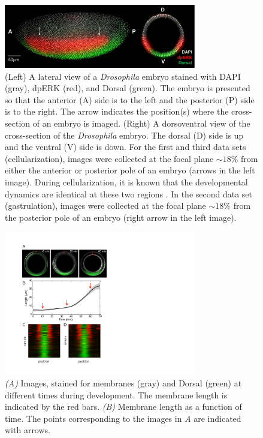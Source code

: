 \documentclass{pnastwo}
\begin{document}
\begin{figure}
\includegraphics[width=8.4cm]{ap_dv}
\caption{(Left) A lateral view of a {\it Drosophila} embryo stained with DAPI (gray), dpERK (red), and Dorsal (green). The embryo is presented so that the anterior (A) side is to the left and the posterior (P) side is to the right. The arrow indicates the position(s) where the cross-section of an embryo is imaged. (Right) A dorsoventral view of the cross-section of the {\it Drosophila} embryo. The dorsal (D) side is up and the ventral (V) side is down. For the first and third data sets (cellularization), images were collected at the focal plane $\sim 18\%$ from either the anterior or posterior pole of an embryo (arrows in the left image). During cellularization, it is known that the developmental dynamics are identical at these two regions \cite{...}. In the second data set (gastrulation), images were collected at the focal plane $\sim 18\%$ from the posterior pole of an embryo (right arrow in the left image). }
\label{fig:ap_dv}
\end{figure}

\begin{figure}
\includegraphics[width=8.4cm, trim=0cm 5.6cm 0cm 0cm, clip]{SI_fig6}
\caption{{\it (A)} Images, stained for membranes (gray) and Dorsal (green) at different times during development. The membrane length is indicated by the red bars. {\it (B)} Membrane length as a function of time. The points corresponding to the images in {\it A} are indicated with arrows.}
\label{fig:membrane_compare}
\end{figure}
\end{document}
